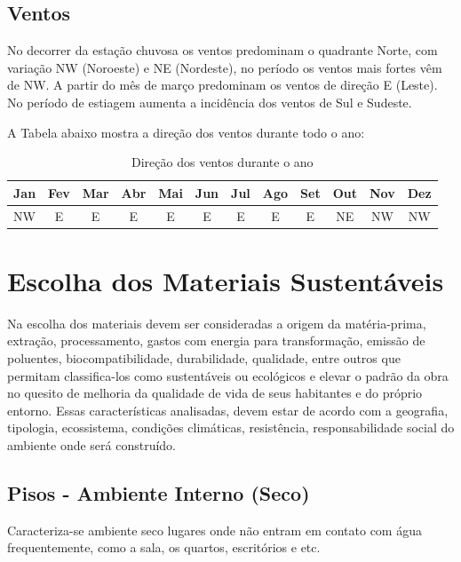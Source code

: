 \subsection{Ventos}

	No decorrer da estação chuvosa os ventos predominam o quadrante Norte, com variação NW (Noroeste)  e NE (Nordeste), no período os ventos mais fortes vêm de NW. A partir do mês de março predominam os ventos de direção E (Leste). No período de estiagem aumenta a incidência dos ventos de Sul e Sudeste.

	A Tabela abaixo mostra a direção dos ventos durante todo o ano:

\begin{table}[H]
\begin{tabular}{|c|c|c|c|c|c|c|c|c|c|c|c|}
\hline 
Jan & Fev & Mar & Abr & Mai & Jun & Jul & Ago & Set & Out & Nov & Dez\tabularnewline
\hline 
\hline 
NW & E & E & E & E & E & E & E & E & NE & NW & NW\tabularnewline
\hline 
\end{tabular}
\caption{Direção dos ventos durante o ano}
\end{table}


\section{Escolha dos Materiais Sustentáveis}

	Na escolha dos materiais devem ser consideradas a origem da matéria-prima, extração, processamento, gastos com energia para transformação, emissão de poluentes, biocompatibilidade, durabilidade, qualidade, entre outros que permitam classifica-los como sustentáveis ou ecológicos e elevar o padrão da obra no quesito de melhoria da qualidade de vida de seus habitantes e do próprio entorno. Essas características analisadas, devem estar de acordo com a geografia, tipologia, ecossistema, condições climáticas, resistência, responsabilidade social do ambiente onde será construído.

\subsection{Pisos - Ambiente Interno (Seco)}
	
	Caracteriza-se ambiente seco lugares onde não entram em contato com água frequentemente, como a sala, os quartos, escritórios e etc.

